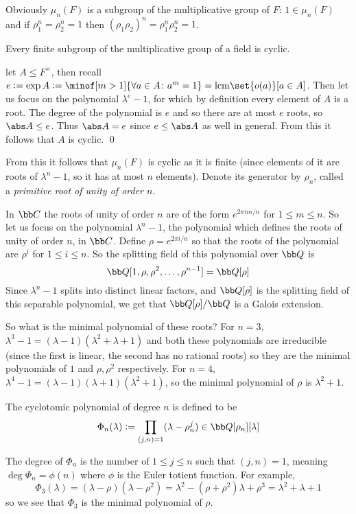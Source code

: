 Obviously $\mu_n(F)$ is a subgroup of the multiplicative group of $F$: $1\in\mu_n(F)$ and if $\rho_1^n=\rho_2^n=1$ then $(\rho_1\rho_2)^n=\rho_1^n\rho_2^n=1$.

\bprop

    Every finite subgroup of the multiplicative group of a field is cyclic.

\eprop

\Proof let $A\leq F^\times$, then recall $e\coloneqq\exp A\coloneqq\minof[m>1]{\forall a\in A\colon a^m=1}={\rm lcm}\set{o(a)}[a\in A]$.
Then let us focus on the polynomial $\lambda^e-1$, for which by definition every element of $A$ is a root.
The degree of the polynomial is $e$ and so there are at most $e$ roots, so $\abs A\leq e$.
Thus $\abs A=e$ since $e\leq\abs A$ as well in general.
From this it follows that $A$ is cyclic.
\qed

From this it follows that $\mu_n(F)$ is cyclic as it is finite (since elements of it are roots of $\lambda^n-1$, so it has at most $n$ elements).
Denote its generator by $\rho_n$, called a {\it primitive root of unity of order $n$}.

In ${\bb C}$ the roots of unity of order $n$ are of the form $e^{2\pi i m/n}$ for $1\leq m\leq n$.
So let us focus on the polynomial $\lambda^n-1$, the polynomial which defines the roots of unity of order $n$, in ${\bb C}$.
Define $\rho=e^{2\pi i/n}$ so that the roots of the polynomial are $\rho^i$ for $1\leq i\leq n$.
So the splitting field of this polynomial over ${\bb Q}$ is
$$ {\bb Q}[1,\rho,\rho^2,\dots,\rho^{n-1}] = {\bb Q}[\rho] $$
Since $\lambda^n-1$ splits into distinct linear factors, and ${\bb Q}[\rho]$ is the splitting field of this separable polynomial, we get that ${\bb Q}[\rho]/{\bb Q}$ is a Galois extension.

So what is the minimal polynomial of these roots?
For $n=3$, $\lambda^3-1=(\lambda-1)(\lambda^2+\lambda+1)$ and both these polynomials are irreducible (since the first is linear, the second has no rational roots) so they are the minimal polynomials of
$1$ and $\rho,\rho^2$ respectively.
For $n=4$, $\lambda^4-1=(\lambda-1)(\lambda+1)(\lambda^2+1)$, so the minimal polynomial of $\rho$ is $\lambda^2+1$.

\bdefn

    The {\emphcolor cyclotomic polynomial} of degree $n$ is defined to be
    $$ \Phi_n(\lambda) \coloneqq \prod_{(j,n)=1}(\lambda-\rho_n^j) \in {\bb Q}[\rho_n][\lambda] $$

\edefn

The degree of $\Phi_n$ is the number of $1\leq j\leq n$ such that $(j,n)=1$, meaning $\deg\Phi_n=\phi(n)$ where $\phi$ is the Euler totient function.
For example,
$$ \Phi_3(\lambda) = (\lambda-\rho)(\lambda-\rho^2) = \lambda^2 - (\rho+\rho^2)\lambda + \rho^3 = \lambda^2 + \lambda + 1 $$
so we see that $\Phi_3$ is the minimal polynomial of $\rho$.

